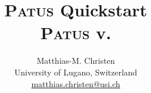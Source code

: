 \documentclass[a4paper,9pt]{extarticle}
\title{
  {\Huge \textsc{Patus} Quickstart}\\
  {\small \textsc{Patus} v.\patusversion}
}
\author{
  Matthias-M. Christen\\  
  {\small University of Lugano, Switzerland}\\
  {\small \href{mailto:matthias.christen@usi.ch}{matthias.christen@usi.ch}}
}
\begin{document}
\maketitle
\date









{\small}
\end{document}
